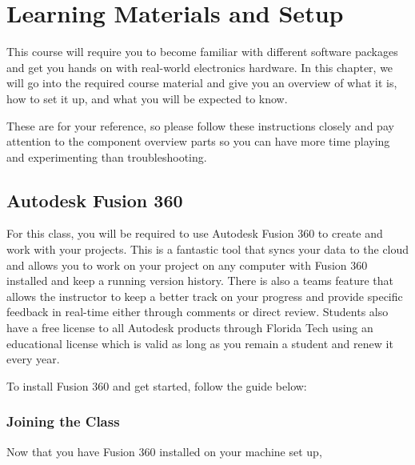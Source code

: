 %

\chapter{Learning Materials and Setup}
\setchapterpreamble[u]{\margintoc}

This course will require you to become familiar with different software packages and get you hands on with real-world electronics hardware.
In this chapter, we will go into the required course material and give you an overview of what it is, how to set it up, and what you will be expected to know.

These are for your reference, so please follow these instructions closely and pay attention to the component overview parts so you can have more time playing and experimenting than troubleshooting.

\section{Autodesk Fusion 360}
    For this class, you will be required to use Autodesk Fusion 360 to create and work with your projects.
    This is a fantastic tool that syncs your data to the cloud and allows you to work on your project on any computer with Fusion 360 installed and keep a running version history.
    There is also a teams feature that allows the instructor to keep a better track on your progress and provide specific feedback in real-time either through comments or direct review.
    Students also have a free license to all Autodesk products through Florida Tech using an educational license which is valid as long as you remain a student and renew it every year.

    To install Fusion 360 and get started, follow the guide below:

    

    \subsection*{Joining the Class}
    Now that you have Fusion 360 installed on your machine set up, 


